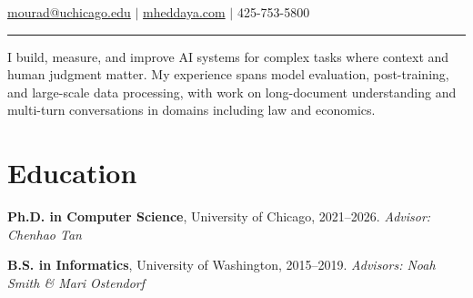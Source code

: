 \documentclass[11pt,letterpaper]{article}
\begin{document}
\hfill{\normalsize \href{mailto:mourad@uchicago.edu}{mourad@uchicago.edu} $|$ \href{https://mheddaya.com}{mheddaya.com} $|$ 425-753-5800}
\vspace{2pt}
\hrule

\vspace{12pt}
\noindent 
I build, measure, and improve AI systems for complex tasks where context and human judgment matter. My experience spans model evaluation, post-training, and large-scale data processing, with work on long-document understanding and multi-turn conversations in domains including law and economics.

\section*{Education}

\noindent\textbf{Ph.D. in Computer Science}, University of Chicago, 2021--2026. \textit{Advisor: Chenhao Tan}

\vspace{4pt}

\noindent\textbf{B.S. in Informatics}, University of Washington, 2015--2019. \textit{Advisors: Noah Smith \& Mari Ostendorf}

\end{document}
